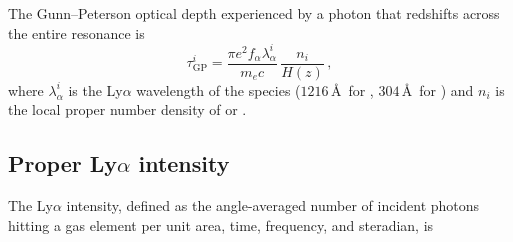 \documentclass[apj,twocolumn, appendixfloats, twocolappendix, numberedappendix, tighten]{openjournal}
\begin{document}
\begin{appendix}
The Gunn--Peterson optical depth experienced by a photon that redshifts across the entire resonance is
\begin{equation}
    \tau^i_\mathrm{GP} = \frac{\pi e^2 f_\alpha \lambda^i_\alpha}{m_e c}\,\frac{n_i}{H(z)}\,,
\end{equation}
where $\lambda^i_\alpha$ is the Ly$\alpha$ wavelength of the species ($1216$\,\AA\ for , $304$\,\AA\ for
) and $n_i$ is the local proper number density of  or  \citep{Hirata2006}.









\subsection{Proper \texorpdfstring{Ly$\alpha$}{Lyman-alpha} intensity}


The Ly$\alpha$ intensity, defined as the angle-averaged number of incident photons hitting a gas element per unit area, time, frequency, and steradian, is


\end{appendix}
\end{document}
